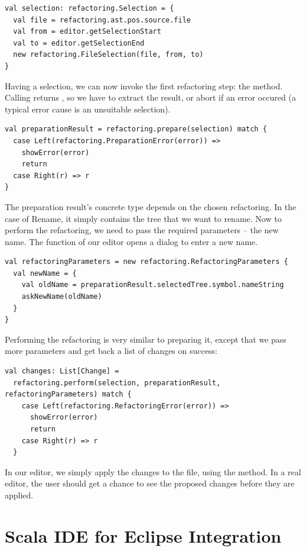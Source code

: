 \documentclass[10pt,a4paper,oneside]{scrreprt}
\begin{document}
\begin{lstlisting}
val selection: refactoring.Selection = {
  val file = refactoring.ast.pos.source.file
  val from = editor.getSelectionStart
  val to = editor.getSelectionEnd
  new refactoring.FileSelection(file, from, to)
}
\end{lstlisting}

Having a selection, we can now invoke the first refactoring step: the  method. Calling  returns , so we have to extract the result, or abort if an error occured (a typical error cause is an unsuitable selection).

\begin{lstlisting}
val preparationResult = refactoring.prepare(selection) match {
  case Left(refactoring.PreparationError(error)) => 
    showError(error)
    return
  case Right(r) => r
}
\end{lstlisting}

The preparation result's concrete type depends on the chosen refactoring. In the case of Rename, it simply contains the tree that we want to rename. Now to perform the refactoring, we need to pass the required parameters -- the new name. The  function of our editor opens a dialog to enter a new name.

\begin{lstlisting}
val refactoringParameters = new refactoring.RefactoringParameters {
  val newName = {
    val oldName = preparationResult.selectedTree.symbol.nameString
    askNewName(oldName)
  }
}
\end{lstlisting}

Performing the refactoring is very similar to preparing it, except that we pass more parameters and get back a list of changes on success:

\begin{lstlisting}
val changes: List[Change] = 
  refactoring.perform(selection, preparationResult, refactoringParameters) match {
    case Left(refactoring.RefactoringError(error)) => 
      showError(error)
      return
    case Right(r) => r
  }
\end{lstlisting}

In our editor, we simply apply the changes to the file, using the  method. In a real editor, the user should get a chance to see the proposed changes before they are applied.

\section{Scala IDE for Eclipse Integration}
\end{document}
